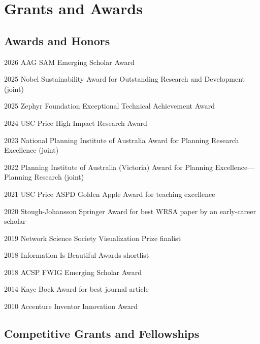 \documentclass[11pt,a4paper]{report} %
\begin{document}
\section*{Grants and Awards}

\subsection*{Awards and Honors}

\begin{tablist}

\item[2026] \tab{}AAG SAM Emerging Scholar Award
\item[2025] \tab{}Nobel Sustainability Award for Outstanding Research and Development (joint)
\item[2025] \tab{}Zephyr Foundation Exceptional Technical Achievement Award
\item[2024] \tab{}USC Price High Impact Research Award
\item[2023] \tab{}National Planning Institute of Australia Award for Planning Research Excellence (joint)
\item[2022] \tab{}Planning Institute of Australia (Victoria) Award for Planning Excellence---Planning Research (joint)
\item[2021] \tab{}USC Price ASPD Golden Apple Award for teaching excellence
\item[2020] \tab{}Stough-Johansson Springer Award for best WRSA paper by an early-career scholar
\item[2019] \tab{}Network Science Society Visualization Prize finalist
\item[2018] \tab{}Information Is Beautiful Awards shortlist
\item[2018] \tab{}ACSP FWIG Emerging Scholar Award
\item[2014] \tab{}Kaye Bock Award for best journal article
\item[2010] \tab{}Accenture Inventor Innovation Award

\end{tablist}

\subsection*{Competitive Grants and Fellowships}
\end{document}
